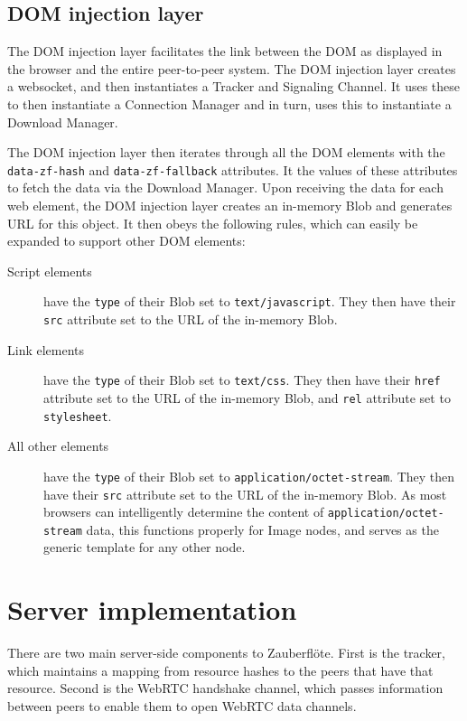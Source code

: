 \documentclass[letterpaper,twocolumn,10pt]{article}
\newcommand{\zbf}{Zauberfl\"{o}te\xspace}
\begin{document}
\subsection{DOM injection layer}
The DOM injection layer facilitates the link between the DOM as displayed in the browser and the entire peer-to-peer system. The DOM injection layer creates a websocket, and then instantiates a Tracker and Signaling Channel. It uses these to then instantiate a Connection Manager and in turn, uses this to instantiate a Download Manager.

The DOM injection layer then iterates through all the DOM elements with the \texttt{data-zf-hash} and \texttt{data-zf-fallback} attributes. It the values of these attributes to fetch the data via the Download Manager. Upon receiving the data for each web element, the DOM injection layer creates an in-memory Blob and generates URL for this object. It then obeys the following rules, which can easily be expanded to support other DOM elements:

\begin{description}
\item[Script elements] have the \texttt{type} of their Blob set to \texttt{text/javascript}. They then have their \texttt{src} attribute set to the URL of the in-memory Blob.
\item[Link elements] have the \texttt{type} of their Blob set to \texttt{text/css}. They then have their \texttt{href} attribute set to the URL of the in-memory Blob, and \texttt{rel} attribute set to \texttt{stylesheet}.
\item[All other elements] have the \texttt{type} of their Blob set to \texttt{application/octet-stream}. They then have their \texttt{src} attribute set to the URL of the in-memory Blob. As most browsers can intelligently determine the content of \texttt{application/octet-stream} data, this functions properly for Image nodes, and serves as the generic template for any other node.
\end{description}

\section{Server implementation}

There are two main server-side components to \zbf. First is the tracker,
which maintains a mapping from resource hashes to the peers that have that
resource. Second is the WebRTC handshake channel, which passes information
between peers to enable them to open WebRTC data channels.
\end{document}
